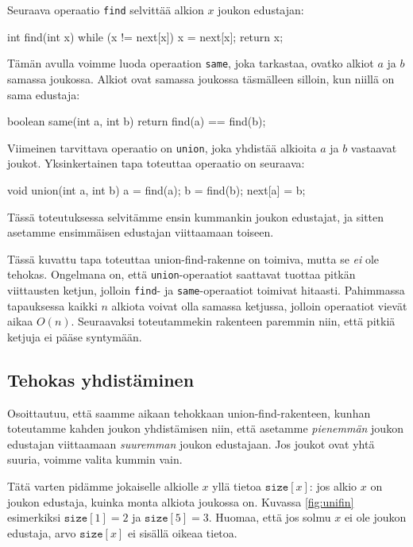 Seuraava operaatio \texttt{find} selvittää alkion $x$ joukon edustajan:

\begin{code}
int find(int x) {
    while (x != next[x]) {
        x = next[x];
    }
    return x;
}
\end{code}

Tämän avulla voimme luoda operaation \texttt{same}, joka tarkastaa,
ovatko alkiot $a$ ja $b$ samassa joukossa.
Alkiot ovat samassa joukossa täsmälleen silloin, kun niillä
on sama edustaja:

\begin{code}
boolean same(int a, int b) {
    return find(a) == find(b);
}
\end{code}

Viimeinen tarvittava operaatio on \texttt{union}, joka yhdistää alkioita
$a$ ja $b$ vastaavat joukot.
Yksinkertainen tapa toteuttaa operaatio on seuraava:

\begin{code}
void union(int a, int b) {
    a = find(a);
    b = find(b);
    next[a] = b;
}
\end{code}

Tässä toteutuksessa selvitämme ensin kummankin joukon edustajat,
ja sitten asetamme ensimmäisen edustajan viittaamaan toiseen.

Tässä kuvattu tapa toteuttaa union-find-rakenne on toimiva,
mutta se \emph{ei} ole tehokas.
Ongelmana on, että \texttt{union}-operaatiot saattavat tuottaa
pitkän viittausten ketjun, jolloin \texttt{find}- ja
\texttt{same}-operaatiot toimivat hitaasti.
Pahimmassa tapauksessa kaikki $n$ alkiota voivat olla
samassa ketjussa, jolloin operaatiot vievät aikaa $O(n)$.
Seuraavaksi toteutammekin rakenteen paremmin niin,
että pitkiä ketjuja ei pääse syntymään.

\subsection{Tehokas yhdistäminen}

Osoittautuu, että saamme aikaan tehokkaan union-find-rakenteen,
kunhan toteutamme kahden joukon yhdistämisen niin,
että asetamme \emph{pienemmän} joukon edustajan viittaamaan
\emph{suuremman} joukon edustajaan. Jos joukot ovat yhtä suuria,
voimme valita kummin vain.

Tätä varten pidämme jokaiselle alkiolle $x$ yllä tietoa
$\texttt{size}[x]$: jos alkio $x$ on joukon edustaja,
kuinka monta alkiota joukossa on.
Kuvassa \ref{fig:unifin} esimerkiksi $\texttt{size}[1]=2$
ja $\texttt{size}[5]=3$.
Huomaa, että jos solmu $x$ ei ole joukon edustaja,
arvo $\texttt{size}[x]$ ei sisällä oikeaa tietoa.

